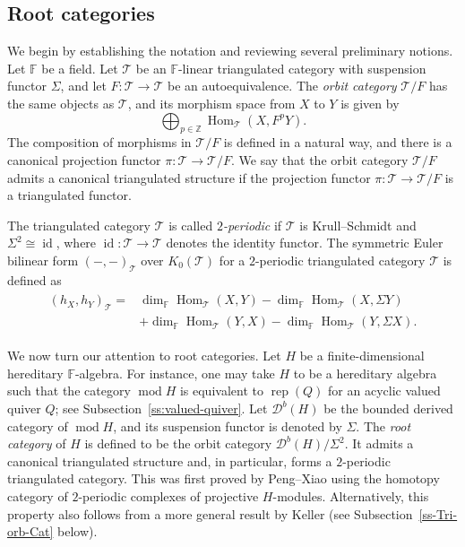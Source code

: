 \documentclass[12pt,reqno]{amsart}
\numberwithin{equation}{section}
\renewcommand{\mod}{\operatorname{mod}\nolimits}
\newcommand{\rep}{\operatorname{rep}\nolimits}
\newcommand{\Hom}{\operatorname{Hom}\nolimits}
\newcommand{\id}{\operatorname{id}\nolimits}
\newcommand{\go}{{K_0}}
\begin{document}
	\subsection{Root categories}\label{ss:root-cat}
	We begin by establishing the notation and reviewing several preliminary notions. Let $\mathbb{F}$ be a field. Let $\mathcal{T}$ be an $\mathbb{F}$-linear triangulated category with suspension functor $\Sigma$, and let
	$F:\mathcal{T}\rightarrow\mathcal{T}$ be an autoequivalence. The {\em orbit category}
	$\mathcal{T}/F$ has the same objects as $\mathcal{T}$, and its morphism space
	from $X$ to $Y$ is given by
	\[
	\bigoplus_{p\in \mathbb{Z}} \Hom_{\mathcal{T}}(X,F^pY).
	\]
	The composition of morphisms in $\mathcal{T}/F$ is defined in a natural way, and there is
	a canonical projection functor
	$\pi:\mathcal{T}\longrightarrow \mathcal{T}/F$.  We say that the orbit category $\mathcal{T}/F$ admits a canonical triangulated structure if the projection functor $\pi:\mathcal{T}\rightarrow \mathcal{T}/F$ is a triangulated functor.
	
	The triangulated category $\mathcal{T}$ is called {\em $2$-periodic} if
	$\mathcal{T}$ is Krull--Schmidt and $\Sigma^2\cong \id$, where
	$\id:\mathcal{T}\rightarrow\mathcal{T}$ denotes the identity functor. 
	The symmetric Euler bilinear form $(-,-)_{\mathcal{T}}$ over $\go(\mathcal{T})$ for a $2$-periodic triangulated category $\mathcal{T}$ is defined as
	\begin{align}\label{eq:sym-Euler-form}
		\begin{split} (h_{X} ,h_{Y})_{\mathcal{T}}=&\operatorname{dim}_{\mathbb{F}} \operatorname{Hom}_{\mathcal{T}}(X, Y)-\operatorname{dim}_{\mathbb{F}} \operatorname{Hom}_{\mathcal{T}}(X, \Sigma Y) \\ &+\operatorname{dim}_{\mathbb{F}} \operatorname{Hom}_{\mathcal{T}}(Y, X)-\operatorname{dim}_{\mathbb{F}} \operatorname{Hom}_{\mathcal{T}}(Y, \Sigma X). 
		\end{split}
	\end{align}
	
	We now turn our attention to root categories. Let $H$ be a
	finite-dimensional hereditary $\mathbb{F}$-algebra. For instance, one may take
	$H$ to be a hereditary algebra such that the category $\mod H$ is equivalent to $\rep(Q)$ for an acyclic
	valued quiver $Q$; see Subsection~\ref{ss:valued-quiver}. Let $\mathcal{D}^b(H)$ be the bounded derived category of $\mod H$, and its suspension functor is denoted by $\Sigma$. The \emph{root category}
	of $H$ is defined to be the orbit category
	$\mathcal{D}^b(H)/\Sigma^2 .$
	It admits a canonical triangulated structure and, in particular, forms a
	$2$-periodic triangulated category. This was first proved by Peng--Xiao
	\cite{PX97-Root-cat-simple-Lie} using the homotopy category of $2$-periodic
	complexes of projective $H$-modules. Alternatively, this property also follows from a more general result by Keller
	\cite{Ke05-tri-orb-cat} (see Subsection~\ref{ss-Tri-orb-Cat} below).
	
\end{document}
